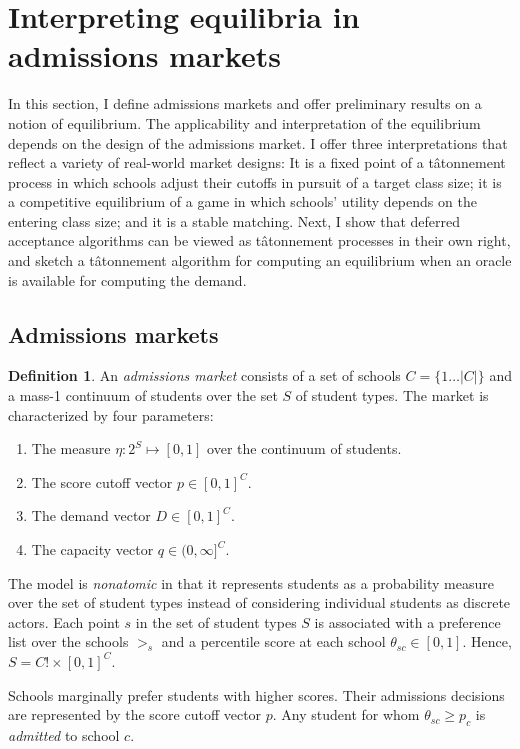 \documentclass[12pt]{article}
\numberwithin{equation}{subsection}
\theoremstyle{definition}
\newtheorem{definition}{Definition}
\begin{document}
\section{Interpreting equilibria in admissions markets} \label{interpeqinadmmkts}
In this section, I define admissions markets and offer preliminary results on a notion of equilibrium. The applicability and interpretation of the equilibrium depends on the design of the admissions market. I offer three interpretations that reflect a variety of real-world market designs: It is a fixed point of a t\^{a}tonnement process in which schools adjust their cutoffs in pursuit of a target class size; it is a competitive equilibrium of a game in which schools' utility depends on the entering class size; and it is a stable matching. Next, I show that deferred acceptance algorithms can be viewed as t\^{a}tonnement processes in their own right, and sketch a t\^{a}tonnement algorithm for computing an equilibrium when an oracle is available for computing the demand.

\subsection{Admissions markets}
\begin{definition} An \emph{admissions market} consists of a set of schools $C = \{ 1\dots |C| \}$ and a mass-1 continuum of students over the set $S$ of student types. The market is characterized by four parameters:
\begin{enumerate}
\item The measure $\eta: 2^S \mapsto [0, 1]$ over the continuum of students.
\item The score cutoff vector $p \in [0, 1]^C$. 
\item The demand vector $D \in [0, 1]^C$.
\item The capacity vector $q \in (0, \infty]^C$.
\end{enumerate}
\end{definition}

The model is \emph{nonatomic} in that it represents students as a probability measure over the set of student types instead of considering individual students as discrete actors. Each point $s$ in the set of student types $S$ is associated with a preference list over the schools $>_s$ and a percentile score at each school $\theta_{sc} \in [0,1]$. Hence, $S = C! \times [0, 1]^C$. 

Schools marginally prefer students with higher scores. Their admissions decisions are represented by the score cutoff vector $p$. Any student for whom $\theta_{sc} \geq p_c$ is \emph{admitted} to school $c$. 
\end{document}

